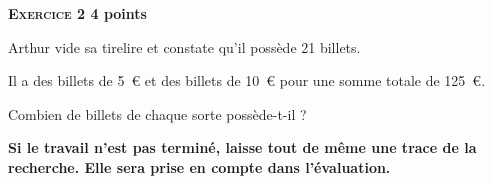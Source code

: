 \textbf{\textsc{Exercice 2} \hfill 4 points}

\medskip 
Arthur vide sa tirelire et constate qu'il possède 21 billets.
 
Il a des billets de 5~\euro{} et des billets de 10~\euro{} pour une somme totale de 125~\euro.

\medskip
 
Combien de billets de chaque sorte possède-t-il ? 

\medskip

\textbf{Si le travail n'est pas terminé, laisse tout de même une trace de la recherche. Elle sera prise en compte dans l'évaluation.}

\bigskip

